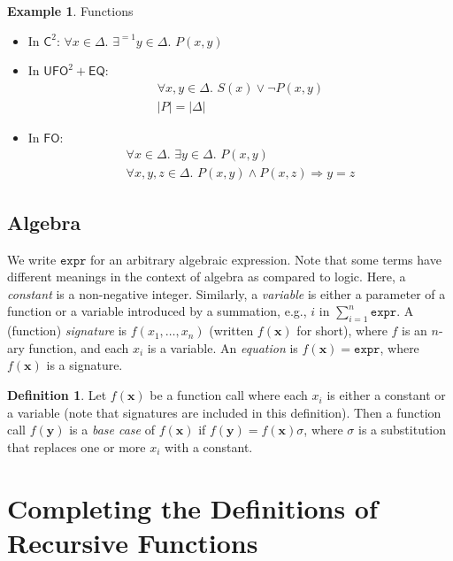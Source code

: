 \documentclass{article}
\theoremstyle{definition}
\newtheorem{definition}{Definition}
\newtheorem{example}{Example}
\newcommand{\expr}{\mathtt{expr}}
\newcommand{\Ctwo}{$\mathsf{C}^{2}$}
\newcommand{\FO}{$\mathsf{FO}$}
\newcommand{\UFO}{$\mathsf{UFO}^{2} + \mathsf{EQ}$}
\begin{document}
\begin{example}\label{example:functions}
  Functions
  \begin{itemize}
    \item In \Ctwo: $\forall x \in \Delta\text{.
          }\exists^{=1} y \in \Delta\text{. }P(x, y)$
    \item In \UFO:
          \begin{gather*}
            \forall x, y \in \Delta\text{. }S(x) \lor \neg P(x, y)\\
            |P| = |\Delta|
          \end{gather*}
    \item In \FO:
          \begin{gather*}
            \forall x \in \Delta\text{. }\exists y \in \Delta\text{. }P(x, y)\\
            \forall x, y, z \in \Delta\text{. }P(x, y) \land P(x, z) \Rightarrow y = z
          \end{gather*}
  \end{itemize}
\end{example}

\subsection{Algebra}\label{sec:algebra}

We write $\expr{}$ for an arbitrary algebraic expression. Note that some terms
have different meanings in the context of algebra as compared to logic. Here, a
\emph{constant} is a non-negative integer. Similarly, a \emph{variable} is
either a parameter of a function or a variable introduced by a summation, e.g.,
$i$ in $\sum_{i=1}^{n} \expr$. A (function) \emph{signature} is
$f(x_{1}, \dots, x_{n})$ (written $f(\mathbf{x})$ for short), where $f$ is an
$n$-ary function, and each $x_{i}$ is a variable. An \emph{equation} is
$f(\mathbf{x}) = \expr{}$, where $f(\mathbf{x})$ is a signature.

\begin{definition}\label{def:basecase}
  Let $f(\mathbf{x})$ be a function call where each $x_{i}$ is either a constant
  or a variable (note that signatures are included in this definition). Then a
  function call $f(\mathbf{y})$ is a \emph{base case} of $f(\mathbf{x})$ if
  $f(\mathbf{y}) = f(\mathbf{x})\sigma$, where $\sigma$ is a substitution that
  replaces one or more $x_{i}$ with a constant.
\end{definition}

\section{Completing the Definitions of Recursive Functions}\label{sec:main}
\end{document}
